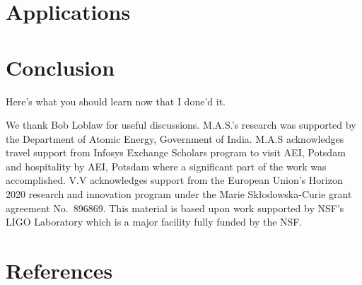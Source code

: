 \documentclass[aps,prd,amsmath,floats,floatfix, twocolumn,
superscriptaddress,nofootinbib,showpacs]{revtex4-1}
\begin{document}

\section{Applications}
\label{sec:applications}


\section{Conclusion}
\label{sec:conclusion}
Here's what you should learn now that I done'd it.


\begin{acknowledgments}
We thank Bob Loblaw for useful discussions.
M.A.S.’s research was supported by the Department of Atomic Energy,
Government of India. M.A.S acknowledges travel support from Infosys
Exchange Scholars program to visit AEI, Potsdam and hospitality by
AEI, Potsdam where a significant part of the work was accomplished.
V.V acknowledges support from the European Union’s Horizon 2020
research and innovation program under the Marie Skłodowska-Curie grant
agreement No.~896869.
This material is based upon work supported by NSF's LIGO Laboratory
which is a major facility fully funded by the NSF.
\end{acknowledgments}

\section*{References}

\end{document}
